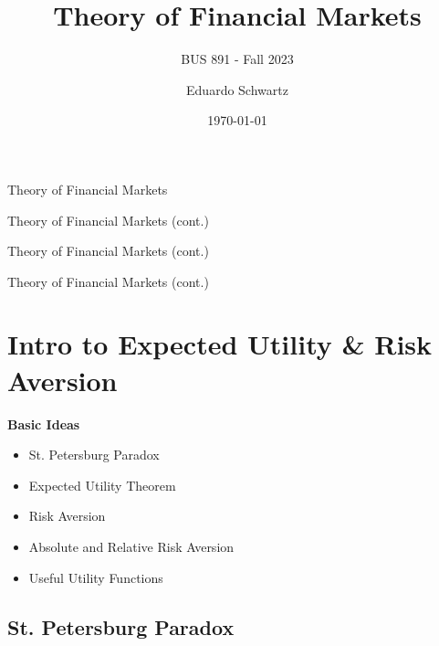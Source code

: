 \documentclass[
14pt,notheorems,hyperref={pdfauthor=whatever}
]{beamer}
\title[
]{Theory of Financial Markets}
\subtitle{BUS 891 - Fall 2023}
\author[
]{
    Eduardo Schwartz 
}
\institute{
    Ryan Beedie Chair in Finance, \\
    Simon Fraser University}
\date{\today}
\begin{document}
{
\begin{frame}
  \titlepage
\end{frame}
}
\addtocounter{framenumber}{-1}

\begin{frame}{Theory of Financial Markets}
    \setcounter{tocdepth}{2}
        \tableofcontents[sections={1-3}]
\end{frame}
\begin{frame}{Theory of Financial Markets (cont.)}
    \setcounter{tocdepth}{2}
        \tableofcontents[sections={4-9}]
\end{frame}
\begin{frame}{Theory of Financial Markets (cont.)}
    \setcounter{tocdepth}{2}
        \tableofcontents[sections={10-14}]
\end{frame}
\begin{frame}{Theory of Financial Markets (cont.)}
    \setcounter{tocdepth}{2}
        \tableofcontents[sections={15-20}]
        \vspace{166px}
\end{frame}

\section{Intro to Expected Utility \& Risk Aversion}
\begin{frame}
\alert{\textbf{Basic Ideas}}
\begin{itemize}
    \item St. Petersburg Paradox
    \item Expected Utility Theorem
    \item Risk Aversion
    \item Absolute and Relative Risk Aversion
    \item Useful Utility Functions
\end{itemize} 
\end{frame}


\subsection{St. Petersburg Paradox}
\end{document}

